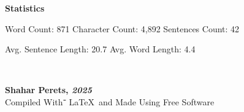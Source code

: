 \documentclass[]{article}
\begin{document}
    \large \textbf{Statistics}\normalsize\dotfill
    
        {
            \hfil Word Count: 871
            \hfil Character Count: 4,892
            \hfil Sentences Count: 42
        }
        
        {
            \hfil Avg. Sentence Length: 20.7
            \hfil Avg. Word Length: 4.4
        }
	
	{\dotfill\\\vfil
		{\begin{center}{
					\textbf{Shahar Perets, \textit{2025}} \\
					\scriptsize Compiled With־ \LaTeX\ and Made Using Free Software
		}\end{center}}
	\vfil}
\end{document}
